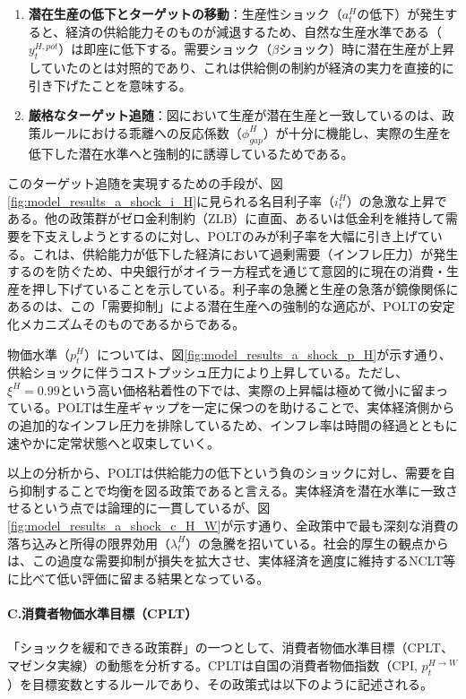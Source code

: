 \begin{enumerate}
    \item\label{itm:model_results_a_shock_asad_analysis_polt_potential} \textbf{潜在生産の低下とターゲットの移動}：生産性ショック（\(a_t^H\)の低下）が発生すると、経済の供給能力そのものが減退するため、自然な生産水準である（\(y_t^{H,pot}\)）は即座に低下する。需要ショック（\(\beta\)ショック）時に潜在生産が上昇していたのとは対照的であり、これは供給側の制約が経済の実力を直接的に引き下げたことを意味する。
    \item\label{itm:model_results_a_shock_asad_analysis_polt_target} \textbf{厳格なターゲット追随}：図において生産が潜在生産と一致しているのは、政策ルールにおける乖離への反応係数（\(\phi_{gap}^H\)）が十分に機能し、実際の生産を低下した潜在水準へと強制的に誘導しているためである。
\end{enumerate}

このターゲット追随を実現するための手段が、図\ref{fig:model_results_a_shock_i_H}に見られる名目利子率（\(i_t^H\)）の急激な上昇である。他の政策群がゼロ金利制約（ZLB）に直面、あるいは低金利を維持して需要を下支えしようとするのに対し、POLTのみが利子率を大幅に引き上げている。これは、供給能力が低下した経済において過剰需要（インフレ圧力）が発生するのを防ぐため、中央銀行がオイラー方程式を通じて意図的に現在の消費・生産を押し下げていることを示している。利子率の急騰と生産の急落が鏡像関係にあるのは、この「需要抑制」による潜在生産への強制的な適応が、POLTの安定化メカニズムそのものであるからである。

物価水準（\(p_t^H\)）については、図\ref{fig:model_results_a_shock_p_H}が示す通り、供給ショックに伴うコストプッシュ圧力により上昇している。ただし、\(\xi^H=0.99\)という高い価格粘着性の下では、実際の上昇幅は極めて微小に留まっている。POLTは生産ギャップを一定に保つのを助けることで、実体経済側からの追加的なインフレ圧力を排除しているため、インフレ率は時間の経過とともに速やかに定常状態へと収束していく。

以上の分析から、POLTは供給能力の低下という負のショックに対し、需要を自ら抑制することで均衡を図る政策であると言える。実体経済を潜在水準に一致させるという点では論理的に一貫しているが、図\ref{fig:model_results_a_shock_c_H_W}が示す通り、全政策中で最も深刻な消費の落ち込みと所得の限界効用（\(\lambda_t^H\)）の急騰を招いている。社会的厚生の観点からは、この過度な需要抑制が損失を拡大させ、実体経済を適度に維持するNCLT等に比べて低い評価に留まる結果となっている。

\paragraph{C.消費者物価水準目標（CPLT）}\label{sec:model_results_a_shock_asad_analysis_cplt}
「ショックを緩和できる政策群」の一つとして、消費者物価水準目標（CPLT、マゼンタ実線）の動態を分析する。CPLTは自国の消費者物価指数（CPI, \(p_t^{H\to W}\)）を目標変数とするルールであり、その政策式は以下のように記述される。

